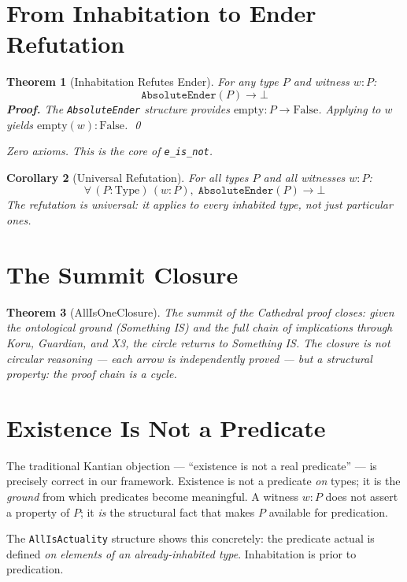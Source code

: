 \documentclass[12pt,a4paper]{article}
\newtheorem{theorem}{Theorem}[section]
\newtheorem{corollary}[theorem]{Corollary}
\begin{document}
\section{From Inhabitation to Ender Refutation}

\begin{theorem}[Inhabitation Refutes Ender]\label{thm:refute}
For any type $P$ and witness $w : P$:
\[
\texttt{AbsoluteEnder}(P) \to \bot
\]
\textbf{Proof.} The \texttt{AbsoluteEnder} structure provides
$\text{empty} : P \to \text{False}$. Applying to $w$ yields
$\text{empty}(w) : \text{False}$. \qed

Zero axioms. This is the core of \texttt{e\_is\_not}.
\end{theorem}

\begin{corollary}[Universal Refutation]\label{cor:universal}
For all types $P$ and all witnesses $w : P$:
\[
\forall\, (P : \text{Type})\, (w : P),\; \texttt{AbsoluteEnder}(P) \to \bot
\]
The refutation is universal: it applies to every inhabited type, not just
particular ones.
\end{corollary}

\section{The Summit Closure}

\begin{theorem}[AllIsOneClosure]\label{thm:closure}
The summit of the Cathedral proof closes: given the ontological ground
(Something IS) and the full chain of implications through Koru, Guardian,
and X3, the circle returns to Something IS. The closure is not circular
reasoning --- each arrow is independently proved --- but a structural
property: the proof chain is a cycle.
\end{theorem}

\section{Existence Is Not a Predicate}

The traditional Kantian objection --- ``existence is not a real predicate'' ---
is precisely correct in our framework. Existence is not a predicate \emph{on}
types; it is the \emph{ground} from which predicates become meaningful.
A witness $w : P$ does not assert a property of $P$; it \emph{is} the
structural fact that makes $P$ available for predication.

The \texttt{AllIsActuality} structure shows this concretely: the predicate
$\text{actual}$ is defined \emph{on elements of an already-inhabited type}.
Inhabitation is prior to predication.
\end{document}
